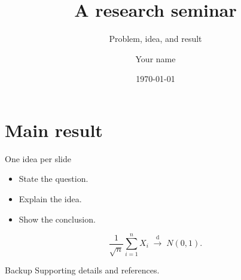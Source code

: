 \documentclass[aspectratio=169,11pt]{beamer}
\title{A research seminar}
\subtitle{Problem, idea, and result}
\author{Your name}
\date{\today}
\begin{document}
\begin{frame}[plain]
  \titlepage
\end{frame}
\section{Main result}
\begin{frame}{One idea per slide}
  \begin{itemize}
    \item State the question.
    \item Explain the idea.
    \item Show the conclusion.
  \end{itemize}
  \[
    \frac{1}{\sqrt{n}}\sum_{i=1}^{n} X_i
    \;\xrightarrow{\mathrm{d}}\; N(0,1).
  \]
\end{frame}
\appendix
\begin{frame}{Backup}
  Supporting details and references.
\end{frame}
\end{document}
